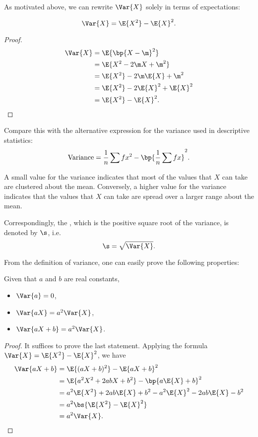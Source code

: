 As motivated above, we can rewrite $\Var{X}$ solely in terms of expectations:

\begin{proposition}
    \[\Var{X} = \E{X^2} - \E{X}^2.\]
\end{proposition}
\begin{proof}
    \begin{align*}
        \Var{X} &= \E{\bp{X - \m}^2}\\
        &= \E{X^2 - 2\m X + \m^2}\\
        &= \E{X^2} - 2\m \E{X} + \m^2\\
        &= \E{X^2} - 2\E{X}^2 + \E{X}^2\\
        &= \E{X^2} - \E{X}^2.
    \end{align*}
\end{proof}

Compare this with the alternative expression for the variance used in descriptive statistics: \[\text{Variance} = \frac1n \sum fx^2 - \bp{\frac1n \sum fx}^2.\]

A small value for the variance indicates that most of the values that $X$ can take are clustered about the mean. Conversely, a higher value for the variance indicates that the values that $X$ can take are spread over a larger range about the mean.

Correspondingly, the , which is the positive square root of the variance, is denoted by $\s$, i.e. \[\s = \sqrt{\Var{X}}.\]

From the definition of variance, one can easily prove the following properties:
\begin{proposition}
    Given that $a$ and $b$ are real constants,
    \begin{itemize}
        \item $\Var{a} = 0$,
        \item $\Var{aX} = a^2 \Var{X}$,
        \item $\Var{aX + b} = a^2 \Var{X}$.
    \end{itemize}
\end{proposition}
\begin{proof}
    It suffices to prove the last statement. Applying the formula $\Var{X} = \E{X^2} - \E{X}^2$, we have
    \begin{align*}
        \Var{aX + b} &= \E{(aX + b)^2} - \E{aX + b}^2\\
        &= \E{a^2 X^2 + 2ab X + b^2} - \bp{a\E{X} + b}^2\\
        &= a^2\E{X^2} + 2ab \E{X} + b^2 - a^2 \E{X}^2 - 2ab \E{X} - b^2\\
        &= a^2 \bs{\E{X^2} -\E{X}^2}\\
        &= a^2 \Var{X}.
    \end{align*}
\end{proof}

